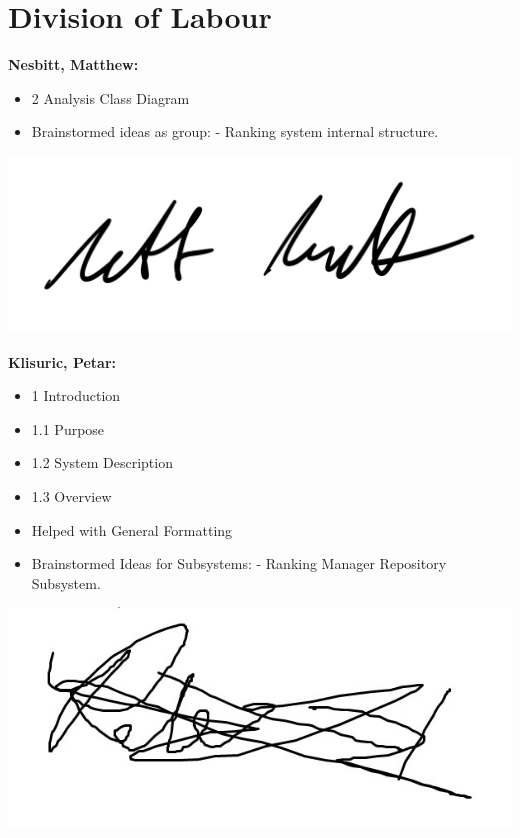 \documentclass[]{article}
\begin{document}
\appendix
\section{Division of Labour}
\label{sec:division_of_labour}
\textbf{Nesbitt, Matthew:}
\begin{itemize}
	\item 2 Analysis Class Diagram
	\item Brainstormed ideas as group:
		\subitem - Ranking system internal structure.
\end{itemize}
\includegraphics[scale=0.15]{mattsignature.jpg}

\textbf{Klisuric, Petar:}
\begin{itemize}
	\item 1 Introduction
	\item 1.1 Purpose
	\item 1.2 System Description
	\item 1.3 Overview
        \item Helped with General Formatting
    \item Brainstormed Ideas for Subsystems:
		\subitem - Ranking Manager Repository Subsystem.
\end{itemize}
\includegraphics[scale=0.15]{petarsignature.jpg}
\end{document}

